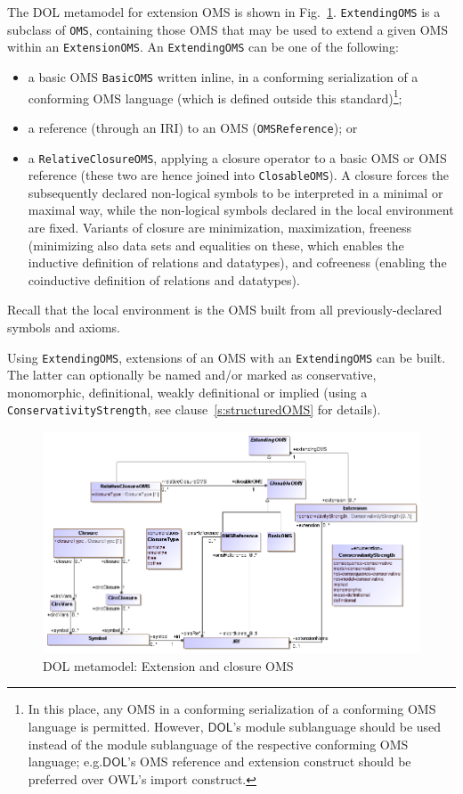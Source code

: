 \documentclass[10pt,fleqn,final]{scrreprt}
\makeatletter
\newcommand*{\eg}{e.g.\@\xspace}
\newcommand*{\syntax}[1]{\texttt{#1}}
\newcommand*{\DOL}{\ensuremath{\mathsf{DOL}}\xspace}
\newenvironment{definitions}[0]{\medskip }{}
\makeatother
\begin{document}
\begin{definitions}
\newpage

\voffset -1cm

The DOL metamodel for extension OMS is shown in Fig.~\ref{fig:extension&closure}.
\syntax{ExtendingOMS} is a subclass of \syntax{OMS}, containing
those OMS that may be used to extend a given OMS within an \syntax{ExtensionOMS}.
An \syntax{ExtendingOMS} can be one of the following:
\begin{itemize}
\item a basic OMS \syntax{BasicOMS} written inline, in a conforming serialization of a conforming OMS 
language (which is defined outside this standard)\footnote{In this place, any OMS in a conforming serialization of a conforming OMS language is permitted.  
However, \DOL's module sublanguage should be used instead of the module sublanguage of 
the respective conforming OMS language; \eg \DOL's OMS reference and extension construct should be preferred over OWL's import construct.};
\item a reference (through an IRI) to an OMS (\syntax{OMSReference}); or
\item a \syntax{RelativeClosureOMS}, applying a closure operator to a
  basic OMS or OMS reference (these two are hence joined into
  \syntax{ClosableOMS}). A closure forces the subsequently declared
  non-logical symbols to be interpreted in a minimal  or
  maximal way, while the non-logical symbols declared  in
  the local environment are fixed. Variants of closure are
  minimization, maximization, freeness (minimizing also data
  sets and equalities on these,  which enables the inductive
  definition of relations and datatypes), and cofreeness (enabling the
  coinductive definition of relations and datatypes).
\end{itemize}
Recall that the local environment is the OMS built from all
previously-declared symbols and axioms.

Using \syntax{ExtendingOMS}, extensions of an OMS with an \syntax{ExtendingOMS}
can be built. The latter can optionally be named and/or marked as conservative, monomorphic, definitional, weakly definitional or implied (using a \syntax{ConservativityStrength}, see clause~\ref{s:structuredOMS} for details).

\medskip
\begin{figure}
  \centering
    \includegraphics[scale=0.47]{mof/extension&closure.png}
  \caption{DOL metamodel: Extension and closure OMS}
  \label{fig:extension&closure}
\end{figure}



\end{definitions}
\end{document}
